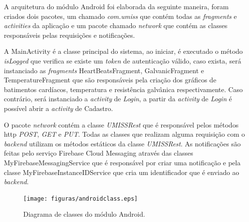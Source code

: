 A arquitetura do módulo Android foi elaborada da seguinte maneira, foram criados dois pacotes,
um chamado \textit{com.umiss} que contém todas as \textit{fragments} e \textit{activities} da
aplicação e um pacote chamado \textit{network} que contém as classes responsáveis pelas
requisições e notificações.

A MainActivity é a classe principal do sistema, ao iniciar, é executado o método 
\textit{isLogged} que verifica se existe um \textit{token} de autenticação válido, caso
 exista, será instanciado as \textit{fragments} HeartBeatsFragment, GalvanicFragment e 
TemperatureFragment que são responsáveis pela criação dos gráficos de batimentos cardíacos,
temperatura e resistência galvânica respectivamente. Caso contrário, será instanciado a 
\textit{activity} de \textit{Login}, a partir da \textit{activity} de \textit{Login} é
possível abrir a \textit{activity} de Cadastro.

O pacote \textit{network} contém a classe \textit{UMISSRest} que é responsável pelos métodos
http \textit{POST}, \textit{GET} e \textit{PUT}. Todas as classes que realizam alguma 
requisição com o \textit{backend} utilizam os métodos estáticos da classe \textit{UMISSRest}.
As notificações são feitas pelo serviço Firebase Cloud Messaging através das classes
MyFirebaseMessagingService que é responsável por criar uma notificação e pela classe
MyFirebaseInstanceIDService que cria um identificador que é enviado ao \textit{backend}.


\begin{figure}[H]
    \begin{center}
        \texttt{[image: figuras/androidclass.eps]}
    \end{center}
    \caption{Diagrama de classes do módulo Android.}
\end{figure}